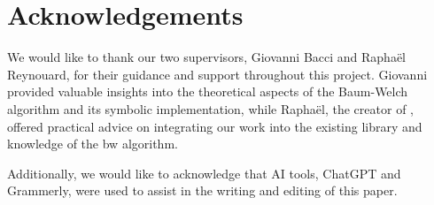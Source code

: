 \section{Acknowledgements}\label{sec:acknowledgements}
We would like to thank our two supervisors, Giovanni Bacci and Raphaël Reynouard, for their guidance and support throughout this project.
Giovanni provided valuable insights into the theoretical aspects of the Baum-Welch algorithm and its symbolic implementation, while Raphaël, the creator of \Jajapy, offered practical advice on integrating our work into the existing \Jajapy library and knowledge of the \gls{bw} algorithm.

Additionally, we would like to acknowledge that AI tools, ChatGPT and Grammerly, were used to assist in the writing and editing of this paper.
